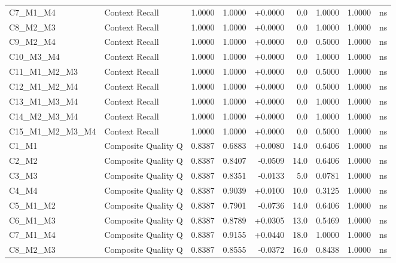 \begin{table}[p]
\begin{tabular*}{\textwidth}{@{\extracolsep{\fill}} l l r r r r r r c @{}}
\addlinespace
C7\_M1\_M4      & Context Recall       & 1.0000 & 1.0000 & +0.0000 & 0.0 & 1.0000 & 1.0000 & ns \\
\addlinespace
C8\_M2\_M3      & Context Recall       & 1.0000 & 1.0000 & +0.0000 & 0.0 & 1.0000 & 1.0000 & ns \\
\addlinespace
C9\_M2\_M4      & Context Recall       & 1.0000 & 1.0000 & +0.0000 & 0.0 & 0.5000 & 1.0000 & ns \\
\addlinespace
C10\_M3\_M4     & Context Recall       & 1.0000 & 1.0000 & +0.0000 & 0.0 & 1.0000 & 1.0000 & ns \\
\addlinespace
C11\_M1\_M2\_M3 & Context Recall       & 1.0000 & 1.0000 & +0.0000 & 0.0 & 0.5000 & 1.0000 & ns \\
\addlinespace
C12\_M1\_M2\_M4 & Context Recall       & 1.0000 & 1.0000 & +0.0000 & 0.0 & 0.5000 & 1.0000 & ns \\
\addlinespace
C13\_M1\_M3\_M4 & Context Recall       & 1.0000 & 1.0000 & +0.0000 & 0.0 & 1.0000 & 1.0000 & ns \\
\addlinespace
C14\_M2\_M3\_M4 & Context Recall       & 1.0000 & 1.0000 & +0.0000 & 0.0 & 1.0000 & 1.0000 & ns \\
\addlinespace
C15\_M1\_M2\_M3\_M4 & Context Recall       & 1.0000 & 1.0000 & +0.0000 & 0.0 & 0.5000 & 1.0000 & ns \\
\addlinespace
C1\_M1          & Composite Quality Q  & 0.8387 & 0.6883 & +0.0080 & 14.0 & 0.6406 & 1.0000 & ns \\
\addlinespace
C2\_M2          & Composite Quality Q  & 0.8387 & 0.8407 & -0.0509 & 14.0 & 0.6406 & 1.0000 & ns \\
\addlinespace
C3\_M3          & Composite Quality Q  & 0.8387 & 0.8351 & -0.0133 & 5.0 & 0.0781 & 1.0000 & ns \\
\addlinespace
C4\_M4          & Composite Quality Q  & 0.8387 & 0.9039 & +0.0100 & 10.0 & 0.3125 & 1.0000 & ns \\
\addlinespace
C5\_M1\_M2      & Composite Quality Q  & 0.8387 & 0.7901 & -0.0736 & 14.0 & 0.6406 & 1.0000 & ns \\
\addlinespace
C6\_M1\_M3      & Composite Quality Q  & 0.8387 & 0.8789 & +0.0305 & 13.0 & 0.5469 & 1.0000 & ns \\
\addlinespace
C7\_M1\_M4      & Composite Quality Q  & 0.8387 & 0.9155 & +0.0440 & 18.0 & 1.0000 & 1.0000 & ns \\
\addlinespace
C8\_M2\_M3      & Composite Quality Q  & 0.8387 & 0.8555 & -0.0372 & 16.0 & 0.8438 & 1.0000 & ns \\

\end{tabular*}
\end{table}
